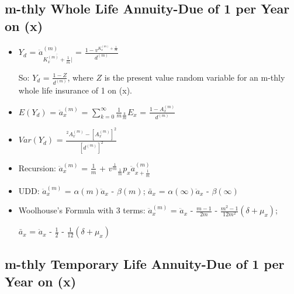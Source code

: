 \documentclass[]{book}
\begin{document}
\subsection{m-thly Whole Life Annuity-Due of 1 per Year on
(x)}\label{m-thly-whole-life-annuity-due-of-1-per-year-on-x}

\begin{itemize}
\item
  \(Y_d\) = \(\ddot{a}^{(m)}_{\overline{K^{(m)}_x + \frac{1}{m}}| }\) =
  \(\frac{1 - v^{K^{(m)}_x + \frac{1}{m}}}{d^{(m)}}\)

  So: \(Y_d\) = \(\frac{1 - Z}{d^{(m)}}\), where \(Z\) is the present
  value random variable for an m-thly whole life insurance of 1 on (x).
\item
  \(E(Y_d)\) = \(\ddot{a}^{(m)}_x\) =
  \(\sum^{\infty}_{k = 0} \frac{1}{m}{}_{\frac{k}{m}}E_x\) =
  \(\frac{1 - A^{(m)}_x}{d^{(m)}}\)
\item
  \(Var(Y_d)\) = \(\frac{^2A^{(m)}_x - [A^{(m)}_x]^2}{[d^{(m)}]^2}\)
\item
  Recursion: \(\ddot{a}^{(m)}_x\) = \(\frac{1}{m}\) +
  \(v^{\frac{1}{m}}{}_{\frac{1}{m}}p_x\ddot{a}^{(m)}_{x + \frac{1}{m}}\)
\item
  UDD: \(\ddot{a}^{(m)}_x\) = \(\alpha(m)\)\(\ddot{a}_x\) -
  \(\beta(m)\); \(\bar{a}_x\) = \(\alpha(\infty)\)\(\ddot{a}_x\) -
  \(\beta(\infty)\)
\item
  Woolhouse's Formula with 3 terms: \(\ddot{a}^{(m)}_x\) =
  \(\ddot{a}_x\) - \(\frac{m - 1}{2m}\) -
  \(\frac{m^2 - 1}{12m^2}\)\((\delta + \mu_x)\);

  \(\bar{a}_x\) = \(\ddot{a}_x\) - \(\frac{1}{2}\) -
  \(\frac{1}{12}\)\((\delta + \mu_x)\)
\end{itemize}

\subsection{m-thly Temporary Life Annuity-Due of 1 per Year on
(x)}\label{m-thly-temporary-life-annuity-due-of-1-per-year-on-x}
\end{document}
